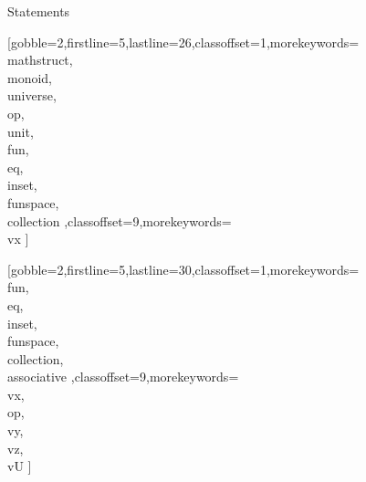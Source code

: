 \documentclass[lang={en,de}]{stex}
\begin{document}
  \begin{sfragment}{Statements}


    [gobble=2,firstline=5,lastline=26,classoffset=1,morekeywords={
    \\mathstruct,\\monoid,\\universe,\\op,\\unit,\\fun,\\eq,\\inset,
    \\funspace,\\collection
    },classoffset=9,morekeywords={
      \\vx
    }]

    [gobble=2,firstline=5,lastline=30,classoffset=1,morekeywords={
    \\fun,\\eq,\\inset,
    \\funspace,\\collection,\\associative
    },classoffset=9,morekeywords={
      \\vx,\\op,\\vy,\\vz,\\vU
    }]
    
  \end{sfragment}
\end{document}
